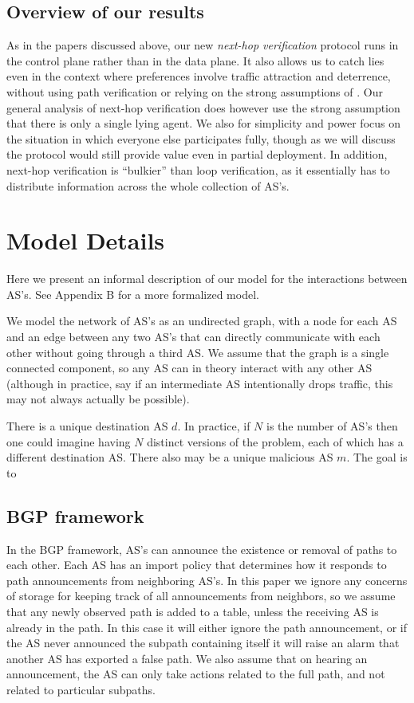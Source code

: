 \documentclass[12pt]{article}
\begin{document}
\subsection{Overview of our results}
As in the papers discussed above, our new \emph{next-hop verification} protocol runs in the control plane rather than in the data plane. It also allows us to catch lies even in the context where preferences involve traffic attraction and deterrence, without using path verification or relying on the strong assumptions of \cite{Attraction}. Our general analysis of next-hop verification does however use the strong assumption that there is only a single lying agent. We also for simplicity and power focus on the situation in which everyone else participates fully, though as we will discuss the protocol would still provide value even in partial deployment. In addition, next-hop verification is ``bulkier'' than loop verification, as it essentially has to distribute information across the whole collection of AS's.


\section{Model Details}
Here we present an informal description of our model for the interactions between AS's. See Appendix B for a more formalized model.

We model the network of AS's as an undirected graph, with a node for each AS and an edge between any two AS's that can directly communicate with each other without going through a third AS. We assume that the graph is a single connected component, so any AS can in theory interact with any other AS (although in practice, say if an intermediate AS intentionally drops traffic, this may not always actually be possible).

There is a unique destination AS $d$. In practice, if $N$ is the number of AS's then one could imagine having $N$ distinct versions of the problem, each of which has a different destination AS. There also may be a unique malicious AS $m$. The goal is to 

\subsection{BGP framework}
In the BGP framework, AS's can announce the existence or removal of paths to each other. Each AS has an import policy that determines how it responds to path announcements from neighboring AS's. In this paper we ignore any concerns of storage for keeping track of all announcements from neighbors, so we assume that any newly observed path is added to a table, unless the receiving AS is already in the path. In this case it will either ignore the path announcement, or if the AS never announced the subpath containing itself it will raise an alarm that another AS has exported a false path. We also assume that on hearing an announcement, the AS can only take actions related to the full path, and not related to particular subpaths.
\end{document}
